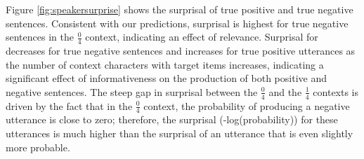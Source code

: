 \documentclass[man, noapacite]{apa2}
\begin{document}



Figure \ref{fig:speakersurprise} shows the surprisal of true positive and true negative sentences.  Consistent with our predictions, surprisal is highest for true negative sentences in the $\frac{0}{4}$ context, indicating an effect of relevance. Surprisal for decreases for true negative sentences and increases for true positive utterances as the number of context characters with target items increases, indicating a significant effect of informativeness on the production of both positive and negative sentences. The steep gap in surprisal between the  $\frac{0}{4}$ and the $\frac{1}{4}$ contexts is driven by the fact that in the  $\frac{0}{4}$ context, the probability of producing a negative utterance is close to zero; therefore, the surprisal (-log(probability)) for these utterances is much higher than the surprisal of an utterance that is even slightly more probable. 
\end{document}
